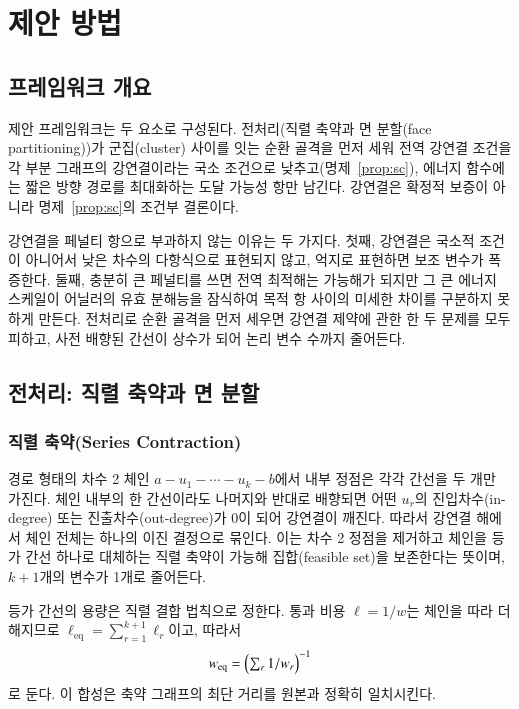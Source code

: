 \documentclass[twocolumn,a4paper]{article}
\begin{document}
\section{제안 방법} \label{sec:method}

\subsection{프레임워크 개요}

제안 프레임워크는 두 요소로 구성된다. 전처리(직렬 축약과 면 분할(face partitioning))가 군집(cluster) 사이를 잇는 순환 골격을 먼저 세워 전역 강연결 조건을 각 부분 그래프의 강연결이라는 국소 조건으로 낮추고(명제~\ref{prop:sc}), 에너지 함수에는 짧은 방향 경로를 최대화하는 도달 가능성 항만 남긴다. 강연결은 확정적 보증이 아니라 명제~\ref{prop:sc}의 조건부 결론이다.

강연결을 페널티 항으로 부과하지 않는 이유는 두 가지다. 첫째, 강연결은 국소적 조건이 아니어서 낮은 차수의 다항식으로 표현되지 않고, 억지로 표현하면 보조 변수가 폭증한다. 둘째, 충분히 큰 페널티를 쓰면 전역 최적해는 가능해가 되지만 그 큰 에너지 스케일이 어닐러의 유효 분해능을 잠식하여 목적 항 사이의 미세한 차이를 구분하지 못하게 만든다. 전처리로 순환 골격을 먼저 세우면 강연결 제약에 관한 한 두 문제를 모두 피하고, 사전 배향된 간선이 상수가 되어 논리 변수 수까지 줄어든다.

\subsection{전처리: 직렬 축약과 면 분할} \label{subsec:method_pre}

\subsubsection*{직렬 축약(Series Contraction)}

경로 형태의 차수 2 체인 \(a-u_1-\cdots-u_k-b\)에서 내부 정점은 각각 간선을 두 개만 가진다. 체인 내부의 한 간선이라도 나머지와 반대로 배향되면 어떤 \(u_r\)의 진입차수(in-degree) 또는 진출차수(out-degree)가 0이 되어 강연결이 깨진다. 따라서 강연결 해에서 체인 전체는 하나의 이진 결정으로 묶인다. 이는 차수 2 정점을 제거하고 체인을 등가 간선 하나로 대체하는 직렬 축약이 가능해 집합(feasible set)을 보존한다는 뜻이며, \(k+1\)개의 변수가 1개로 줄어든다.

등가 간선의 용량은 직렬 결합 법칙으로 정한다. 통과 비용 \(\ell=1/w\)는 체인을 따라 더해지므로 \(\ell_{\mathrm{eq}}=\sum_{r=1}^{k+1}\ell_r\)이고, 따라서
\begin{equation}
    w_{\mathrm{eq}}=\Bigl(\textstyle\sum_{r}1/w_{r}\Bigr)^{-1}
\end{equation}
로 둔다. 이 합성은 축약 그래프의 최단 거리를 원본과 정확히 일치시킨다.
\end{document}
